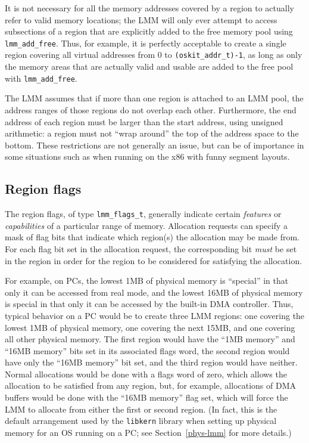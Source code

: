 It is not necessary for all the memory addresses covered by a region
to actually refer to valid memory locations;
the LMM will only ever attempt to access subsections of a region
that are explicitly added to the free memory pool using {\tt lmm_add_free}.
Thus, for example, it is perfectly acceptable
to create a single region covering all virtual addresses
from 0 to {\tt (oskit_addr_t)-1},
as long as only the memory areas that are actually valid and usable
are added to the free pool with {\tt lmm_add_free}.

The LMM assumes that if more than one region is attached to an LMM pool,
the address ranges of those regions do not overlap each other.
Furthermore, the end address of each region
must be larger than the start address, using unsigned arithmetic:
a region must not ``wrap around'' the top of the address space to the bottom.
These restrictions are not generally an issue,
but can be of importance in some situations
such as when running on the x86 with funny segment layouts.

\subsection{Region flags}

The region flags, of type {\tt lmm_flags_t},
generally indicate certain \emph{features} or \emph{capabilities}
of a particular range of memory.
Allocation requests can specify a mask of flag bits
that indicate which region(s) the allocation may be made from.
For each flag bit set in the allocation request,
the corresponding bit \emph{must} be set in the region
in order for the region to be considered for satisfying the allocation.

For example, on PCs,
the lowest 1MB of physical memory is ``special''
in that only it can be accessed from real mode,
and the lowest 16MB of physical memory is special
in that only it can be accessed by the built-in DMA controller.
Thus, typical behavior on a PC would be to create three LMM regions:
one covering the lowest 1MB of physical memory, one covering the next 15MB,
and one covering all other physical memory.
The first region would have the ``1MB memory'' and ``16MB memory'' bits set
in its associated flags word,
the second region would have only the ``16MB memory'' bit set,
and the third region would have neither.
Normal allocations would be done with a flags word of zero,
which allows the allocation to be satisfied from any region,
but, for example, allocations of DMA buffers would be done
with the ``16MB memory'' flag set,
which will force the LMM to allocate from either the first or second region.
(In fact, this is the default arrangement used by the {\tt libkern} library
when setting up physical memory for an OS running on a PC;
see Section~\ref{phys-lmm} for more details.)

